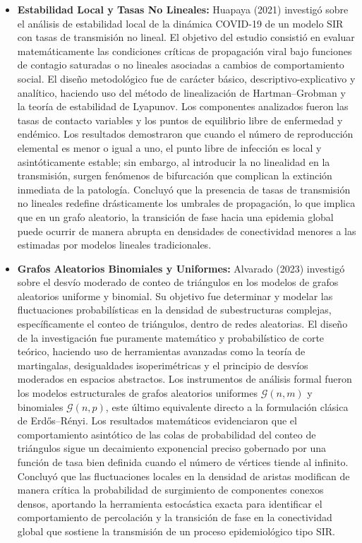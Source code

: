 \documentclass[12pt]{article}
\begin{document}
\begin{itemize}
    \item \textbf{Estabilidad Local y Tasas No Lineales:} Huapaya (2021) investigó sobre el análisis de estabilidad local de la dinámica COVID-19 de un modelo SIR con tasas de transmisión no lineal. El objetivo del estudio consistió en evaluar matemáticamente las condiciones críticas de propagación viral bajo funciones de contagio saturadas o no lineales asociadas a cambios de comportamiento social. El diseño metodológico fue de carácter básico, descriptivo-explicativo y analítico, haciendo uso del método de linealización de Hartman–Grobman y la teoría de estabilidad de Lyapunov. Los componentes analizados fueron las tasas de contacto variables y los puntos de equilibrio libre de enfermedad y endémico. Los resultados demostraron que cuando el número de reproducción elemental es menor o igual a uno, el punto libre de infección es local y asintóticamente estable; sin embargo, al introducir la no linealidad en la transmisión, surgen fenómenos de bifurcación que complican la extinción inmediata de la patología. Concluyó que la presencia de tasas de transmisión no lineales redefine drásticamente los umbrales de propagación, lo que implica que en un grafo aleatorio, la transición de fase hacia una epidemia global puede ocurrir de manera abrupta en densidades de conectividad menores a las estimadas por modelos lineales tradicionales.
    
    \item \textbf{Grafos Aleatorios Binomiales y Uniformes:} Alvarado (2023) investigó sobre el desvío moderado de conteo de triángulos en los modelos de grafos aleatorios uniforme y binomial. Su objetivo fue determinar y modelar las fluctuaciones probabilísticas en la densidad de subestructuras complejas, específicamente el conteo de triángulos, dentro de redes aleatorias. El diseño de la investigación fue puramente matemático y probabilístico de corte teórico, haciendo uso de herramientas avanzadas como la teoría de martingalas, desigualdades isoperimétricas y el principio de desvíos moderados en espacios abstractos. Los instrumentos de análisis formal fueron los modelos estructurales de grafos aleatorios uniformes $\mathcal{G}(n, m)$ y binomiales $\mathcal{G}(n, p)$, este último equivalente directo a la formulación clásica de Erdős–Rényi. Los resultados matemáticos evidenciaron que el comportamiento asintótico de las colas de probabilidad del conteo de triángulos sigue un decaimiento exponencial preciso gobernado por una función de tasa bien definida cuando el número de vértices tiende al infinito. Concluyó que las fluctuaciones locales en la densidad de aristas modifican de manera crítica la probabilidad de surgimiento de componentes conexos densos, aportando la herramienta estocástica exacta para identificar el comportamiento de percolación y la transición de fase en la conectividad global que sostiene la transmisión de un proceso epidemiológico tipo SIR.
\end{itemize}
\end{document}
